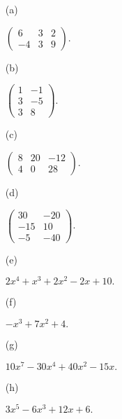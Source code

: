 \begin{Exercise}
\begin{enumerate}[(a)]
\item [(a)]
\begin{answer}
$
\begin{pmatrix}
6 & 3 & 2 \\
-4 & 3 & 9
\end{pmatrix}.
$
\end{answer}

\item [(b)]
\begin{answer}
$
\begin{pmatrix}
1 & -1 \\
3 & -5 \\
3 & 8
\end{pmatrix}.
$
\end{answer}

\item [(c)]
\begin{answer}
$
\begin{pmatrix}
8 & 20 & -12 \\
4 & 0 & 28
\end{pmatrix}.
$
\end{answer}

\item [(d)]
\begin{answer}
$
\begin{pmatrix}
30 & -20 \\
-15 & 10 \\
-5 & -40
\end{pmatrix}.
$
\end{answer}

\item [(e)]
\begin{answer}
$
2x^4+x^3+2x^2-2x+10.
$
\end{answer}

\item [(f)]
\begin{answer}
$
-x^3+7x^2+4.
$
\end{answer}

\item [(g)]
\begin{answer}
$
10x^7-30x^4+40x^2-15x.
$
\end{answer}

\item [(h)]
\begin{answer}
$
3x^5-6x^3+12x+6.
$
\end{answer}
\end{enumerate}
\end{Exercise}
